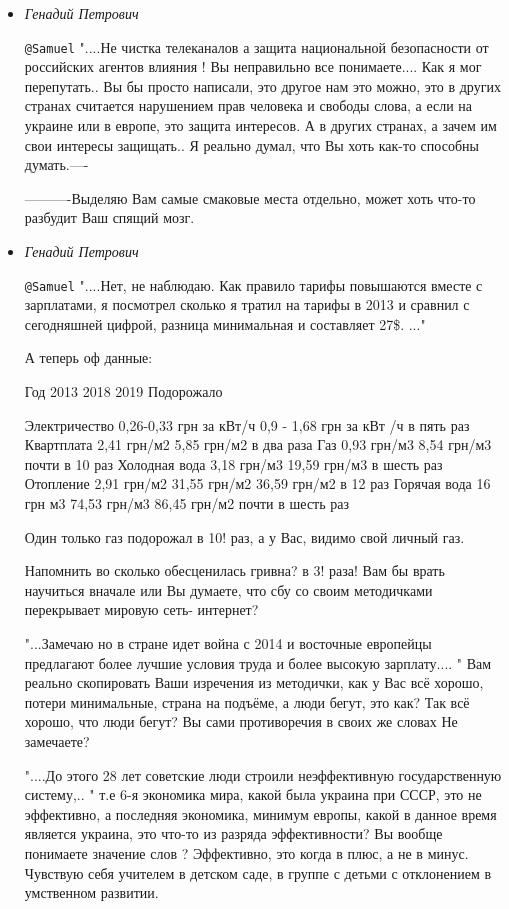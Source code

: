 \begin{itemize}
\begin{itemize}
\item \emph{Генадий Петрович}

\verb|@Samuel|  "....Не чистка телеканалов а защита национальной безопасности
от российских агентов влияния ! Вы неправильно все понимаете.... Как я мог
перепутать.. Вы бы просто написали, это другое нам это можно, это в других
странах считается нарушением прав человека и свободы слова, а если на украине
или в европе, это защита интересов. А в других странах, а зачем им свои
интересы защищать.. Я реально думал, что Вы хоть как-то способны думать.----

 ----------Выделяю Вам самые смаковые места отдельно, может хоть что-то
 разбудит Ваш спящий мозг.

\item \emph{Генадий Петрович}

\verb|@Samuel|  "....Нет, не наблюдаю. Как правило тарифы повышаются вместе с
зарплатами, я посмотрел сколько я тратил на тарифы в 2013 и сравнил с
сегодняшней цифрой, разница минимальная и составляет 27\$. ..."

А теперь оф данные:

Год	2013	2018	2019	Подорожало

Электричество	0,26-0,33 грн за кВт/ч	0,9 - 1,68 грн за кВт /ч	 	в пять раз
Квартплата	2,41 грн/м2	5,85 грн/м2	 	в два раза
Газ	0,93 грн/м3	8,54 грн/м3	 	почти в 10 раз
Холодная вода	3,18 грн/м3	19,59 грн/м3	 	в шесть раз
Отопление	2,91 грн/м2	31,55 грн/м2	36,59 грн/м2	в 12 раз
Горячая вода	16 грн м3	74,53 грн/м3	86,45 грн/м2	почти в шесть раз

Один только газ подорожал в 10! раз, а у Вас, видимо свой личный газ.

Напомнить во сколько обесценилась гривна? в 3! раза! Вам бы врать научиться
вначале или Вы думаете, что сбу со своим методичками перекрывает мировую сеть-
интернет?

"...Замечаю но в стране идет война с 2014 и восточные европейцы предлагают
более лучшие условия труда и более высокую зарплату.... " Вам реально
скопировать Ваши изречения из методички, как у Вас всё хорошо, потери
минимальные, страна на подъёме, а люди бегут, это как? Так всё хорошо, что люди
бегут? Вы сами противоречия в своих же словах Не замечаете?

"....До этого 28 лет советские люди строили неэффективную государственную
систему,.. " т.е 6-я экономика мира, какой была украина при СССР, это не
эффективно, а последняя экономика, минимум европы, какой в данное время
является украина, это что-то из разряда эффективности? Вы вообще понимаете
значение слов ? Эффективно, это когда в плюс, а не в минус. Чувствую себя
учителем в детском саде, в группе с детьми с отклонением в умственном
развитии.


\end{itemize}
\end{itemize}

